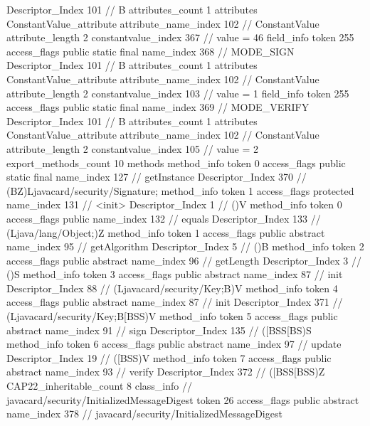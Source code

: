 {{{{{				Descriptor_Index	101		// B
				attributes_count	1
				attributes {
				ConstantValue_attribute {
					attribute_name_index	102		// ConstantValue
					attribute_length	2
					constantvalue_index	367		// value = 46
				}
				}
			}
			field_info {
				token	255
				access_flags	public static final
				name_index	368		// MODE_SIGN
				Descriptor_Index	101		// B
				attributes_count	1
				attributes {
				ConstantValue_attribute {
					attribute_name_index	102		// ConstantValue
					attribute_length	2
					constantvalue_index	103		// value = 1
				}
				}
			}
			field_info {
				token	255
				access_flags	public static final
				name_index	369		// MODE_VERIFY
				Descriptor_Index	101		// B
				attributes_count	1
				attributes {
				ConstantValue_attribute {
					attribute_name_index	102		// ConstantValue
					attribute_length	2
					constantvalue_index	105		// value = 2
				}
				}
			}
			}
			export_methods_count	10
			methods {
				method_info {
					token	0
					access_flags	public static final
					name_index	127		// getInstance
					Descriptor_Index	370		// (BZ)Ljavacard/security/Signature;
				}
				method_info {
					token	1
					access_flags	protected
					name_index	131		// <init>
					Descriptor_Index	1		// ()V
				}
				method_info {
					token	0
					access_flags	public
					name_index	132		// equals
					Descriptor_Index	133		// (Ljava/lang/Object;)Z
				}
				method_info {
					token	1
					access_flags	public abstract
					name_index	95		// getAlgorithm
					Descriptor_Index	5		// ()B
				}
				method_info {
					token	2
					access_flags	public abstract
					name_index	96		// getLength
					Descriptor_Index	3		// ()S
				}
				method_info {
					token	3
					access_flags	public abstract
					name_index	87		// init
					Descriptor_Index	88		// (Ljavacard/security/Key;B)V
				}
				method_info {
					token	4
					access_flags	public abstract
					name_index	87		// init
					Descriptor_Index	371		// (Ljavacard/security/Key;B[BSS)V
				}
				method_info {
					token	5
					access_flags	public abstract
					name_index	91		// sign
					Descriptor_Index	135		// ([BSS[BS)S
				}
				method_info {
					token	6
					access_flags	public abstract
					name_index	97		// update
					Descriptor_Index	19		// ([BSS)V
				}
				method_info {
					token	7
					access_flags	public abstract
					name_index	93		// verify
					Descriptor_Index	372		// ([BSS[BSS)Z
				}
			}
			CAP22_inheritable_count	8
		}
		class_info {		// javacard/security/InitializedMessageDigest
			token	26
			access_flags	public abstract
			name_index	378		// javacard/security/InitializedMessageDigest
}}}
